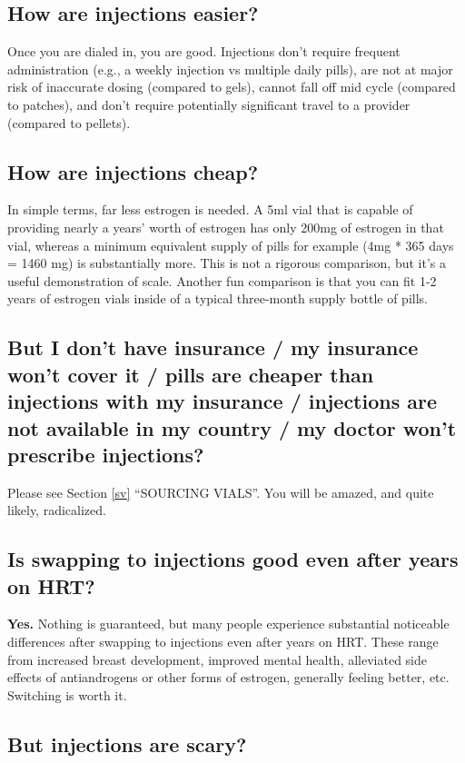 \documentclass{article}
\begin{document}
\subsection{How are injections easier?}

Once you are dialed in, you are good. Injections don’t require frequent administration (e.g., a weekly injection vs multiple daily pills), are not at major risk of inaccurate dosing (compared to gels), cannot fall off mid cycle (compared to patches), and don’t require potentially significant travel to a provider (compared to pellets).

\subsection{How are injections cheap?}

In simple terms, far less estrogen is needed. A 5ml vial that is capable of providing nearly a years’ worth of estrogen has only 200mg of estrogen in that vial, whereas a minimum equivalent supply of pills for example (4mg * 365 days = 1460 mg) is substantially more. This is not a rigorous comparison, but it’s a useful demonstration of scale. Another fun comparison is that you can fit 1-2 years of estrogen vials inside of a typical three-month supply bottle of pills.

\subsection{But I don’t have insurance / my insurance won’t cover it / pills are cheaper than injections with my insurance / injections are not available in my country / my doctor won’t prescribe injections?}

Please see Section \ref{sv} “SOURCING VIALS”. You will be amazed, and quite likely, radicalized.

\subsection{Is swapping to injections good even after years on HRT?}

\textbf{Yes.} Nothing is guaranteed, but many people experience substantial noticeable differences after swapping to injections even after years on HRT. These range from increased breast development, improved mental health, alleviated side effects of antiandrogens or other forms of estrogen, generally feeling better, etc. Switching is worth it.

\subsection{But injections are scary?}
\end{document}
